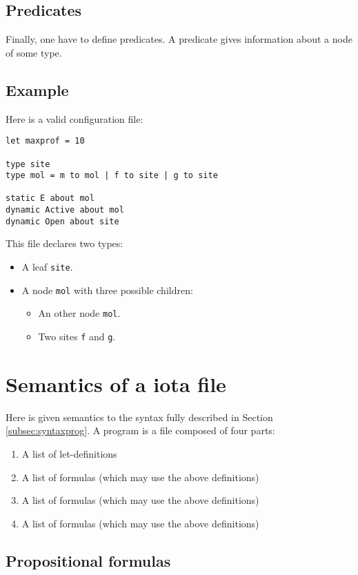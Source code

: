 \documentclass[10pt,a4paper]{article}
\newcommand{\ocaml}{\texttt}
\begin{document}
\subsection{Predicates}
Finally, one have to define predicates. A predicate gives information about a node of some type.

\subsection{Example}
Here is a valid configuration file:
\begin{verbatim}
let maxprof = 10

type site
type mol = m to mol | f to site | g to site

static E about mol
dynamic Active about mol
dynamic Open about site
\end{verbatim}

This file declares two types:

\begin{itemize}
\item A leaf \ocaml{site}.
\item A node \ocaml{mol} with three possible children:
  \begin{itemize}
  \item An other node \ocaml{mol}.
  \item Two sites \ocaml{f} and \ocaml{g}.
  \end{itemize}
\end{itemize}

\section{Semantics of a iota file}
Here is given semantics to the syntax fully described in Section \ref{subsec:syntaxprog}.
A program is a file composed of four parts:

\begin{enumerate}
\item A list of let-definitions
\item A list of formulas (which may use the above definitions)
\item A list of formulas (which may use the above definitions)
\item A list of formulas (which may use the above definitions)
\end{enumerate}

\subsection{Propositional formulas}
\end{document}

